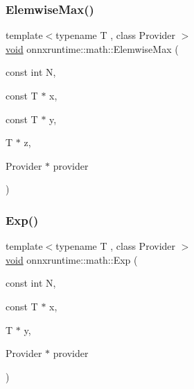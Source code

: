 \mbox{\label{namespaceonnxruntime_1_1math_a708dfaff226b182c1f1ec2ed849fafa6}} 
\subsubsection{\texorpdfstring{Elemwise\+Max()}{ElemwiseMax()}}
{\footnotesize\ttfamily template$<$typename T , class Provider $>$ \\
\mbox{\hyperlink{mlasi_8h_a88f941d423cb2a819b70a1358982b1a6}{void}} onnxruntime\+::math\+::\+Elemwise\+Max (\begin{DoxyParamCaption}\item[{const int}]{N,  }\item[{const T $\ast$}]{x,  }\item[{const T $\ast$}]{y,  }\item[{T $\ast$}]{z,  }\item[{Provider $\ast$}]{provider }\end{DoxyParamCaption})}

\mbox{\label{namespaceonnxruntime_1_1math_ae77fccf2943859c29b77038e543a0801}} 
\subsubsection{\texorpdfstring{Exp()}{Exp()}}
{\footnotesize\ttfamily template$<$typename T , class Provider $>$ \\
\mbox{\hyperlink{mlasi_8h_a88f941d423cb2a819b70a1358982b1a6}{void}} onnxruntime\+::math\+::\+Exp (\begin{DoxyParamCaption}\item[{const int}]{N,  }\item[{const T $\ast$}]{x,  }\item[{T $\ast$}]{y,  }\item[{Provider $\ast$}]{provider }\end{DoxyParamCaption})}

\mbox{\label{namespaceonnxruntime_1_1math_af0161f533f3526e6869f3aefd52240fb}} 
